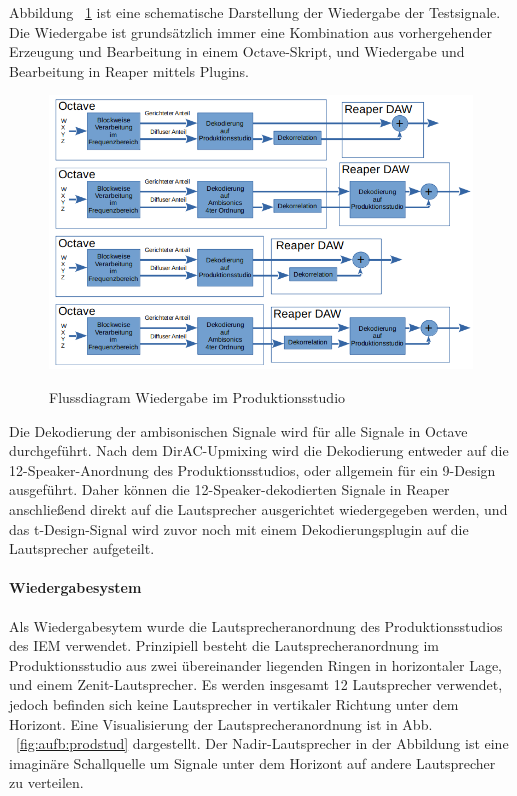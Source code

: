 
Abbildung ~\ref{fig:algos} ist eine schematische Darstellung der Wiedergabe der Testsignale. Die Wiedergabe ist grundsätzlich immer eine Kombination aus vorhergehender Erzeugung und Bearbeitung in einem Octave-Skript, und Wiedergabe und Bearbeitung in Reaper mittels Plugins.

\begin{figure}[!ht]
  \centering
  \includegraphics[width=1\textwidth]{aufbau/plots/algos.png}
  \label{fig:algos}
  \caption{Flussdiagram Wiedergabe im Produktionsstudio}
\end{figure}

Die Dekodierung der ambisonischen Signale wird für alle Signale in Octave durchgeführt. Nach dem DirAC-Upmixing wird die Dekodierung entweder auf die 12-Speaker-Anordnung des Produktionsstudios, oder allgemein für ein 9-Design ausgeführt. Daher können die 12-Speaker-dekodierten Signale in Reaper anschließend direkt auf die Lautsprecher ausgerichtet wiedergegeben werden, und das t-Design-Signal wird zuvor noch mit einem Dekodierungsplugin auf die Lautsprecher aufgeteilt.

\paragraph{Wiedergabesystem}
Als Wiedergabesytem wurde die Lautsprecheranordnung des Produktionsstudios des IEM verwendet. Prinzipiell besteht die Lautsprecheranordnung im Produktionsstudio aus zwei übereinander liegenden Ringen in horizontaler Lage, und einem Zenit-Lautsprecher. Es werden insgesamt 12 Lautsprecher verwendet, jedoch befinden sich keine Lautsprecher in vertikaler Richtung unter dem Horizont. Eine Visualisierung der Lautsprecheranordnung ist in Abb. ~\ref{fig:aufb:prodstud} dargestellt. Der Nadir-Lautsprecher in der Abbildung ist eine imaginäre Schallquelle um Signale unter dem Horizont auf andere Lautsprecher zu verteilen.

